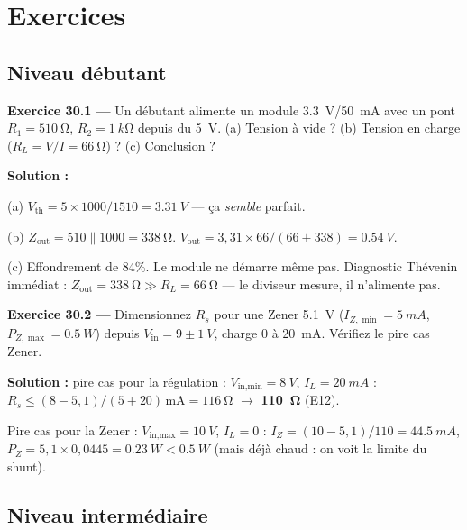 \documentclass[12pt,a4paper,twoside]{book}
\begin{document}
\section*{Exercices}

\subsection*{Niveau débutant}

\textbf{Exercice 30.1 ---} Un débutant alimente un module \SI{3.3}{V}/\SI{50}{mA} avec un pont $R_1 = \SI{510}{\ohm}$, $R_2 = \SI{1}{k\ohm}$ depuis du \SI{5}{V}. (a) Tension à vide ? (b) Tension en charge ($R_L = V/I = \SI{66}{\ohm}$) ? (c) Conclusion ?

\begin{pratique}
\textbf{Solution :}

(a) $V_{\text{th}} = 5\times1000/1510 = \SI{3.31}{V}$ --- ça \textit{semble} parfait.

(b) $Z_{\text{out}} = 510\parallel1000 = \SI{338}{\ohm}$. $V_{\text{out}} = 3{,}31\times66/(66+338) = \SI{0.54}{V}$.

(c) Effondrement de 84\%. Le module ne démarre même pas. Diagnostic Thévenin immédiat : $Z_{\text{out}} = \SI{338}{\ohm} \gg R_L = \SI{66}{\ohm}$ --- le diviseur mesure, il n'alimente pas.
\end{pratique}

\textbf{Exercice 30.2 ---} Dimensionnez $R_s$ pour une Zener \SI{5.1}{V} ($I_{Z,\min} = \SI{5}{mA}$, $P_{Z,\max} = \SI{0.5}{W}$) depuis $V_{\text{in}} = 9\pm\SI{1}{V}$, charge 0 à \SI{20}{mA}. Vérifiez le pire cas Zener.

\begin{pratique}
\textbf{Solution :} pire cas pour la régulation : $V_{\text{in,min}} = \SI{8}{V}$, $I_L = \SI{20}{mA}$ :
$R_s \leq (8-5{,}1)/(5+20)\,\text{mA} = \SI{116}{\ohm}$ $\to$ \textbf{\SI{110}{\ohm}} (E12).

Pire cas pour la Zener : $V_{\text{in,max}} = \SI{10}{V}$, $I_L = 0$ : $I_Z = (10-5{,}1)/110 = \SI{44.5}{mA}$, $P_Z = 5{,}1\times0{,}0445 = \SI{0.23}{W} < \SI{0.5}{W}$ \checkmark{} (mais déjà chaud : on voit la limite du shunt).
\end{pratique}

\subsection*{Niveau intermédiaire}
\end{document}
